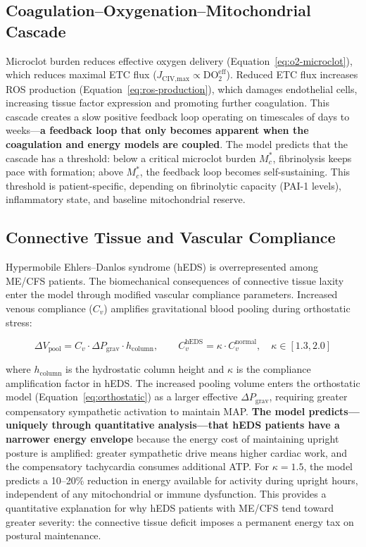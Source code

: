 \subsection{Coagulation--Oxygenation--Mitochondrial Cascade}

Microclot burden reduces effective oxygen delivery (Equation~\ref{eq:o2-microclot}), which reduces maximal ETC flux ($J_{\text{CIV,max}} \propto \text{DO}_{2}^{\text{eff}}$). Reduced ETC flux increases ROS production (Equation~\ref{eq:ros-production}), which damages endothelial cells, increasing tissue factor expression and promoting further coagulation. This cascade creates a slow positive feedback loop operating on timescales of days to weeks---\textbf{a feedback loop that only becomes apparent when the coagulation and energy models are coupled}. The model predicts that the cascade has a threshold: below a critical microclot burden $M_c^*$, fibrinolysis keeps pace with formation; above $M_c^*$, the feedback loop becomes self-sustaining. This threshold is patient-specific, depending on fibrinolytic capacity (PAI-1 levels), inflammatory state, and baseline mitochondrial reserve.

\subsection{Connective Tissue and Vascular Compliance}
\label{sec:eds-coupling}

Hypermobile Ehlers--Danlos syndrome (hEDS) is overrepresented among ME/CFS patients. The biomechanical consequences of connective tissue laxity enter the model through modified vascular compliance parameters. Increased venous compliance ($C_v$) amplifies gravitational blood pooling during orthostatic stress:

\begin{equation}
\label{eq:eds-vascular}
\Delta V_{\text{pool}} = C_v \cdot \Delta P_{\text{grav}} \cdot h_{\text{column}}, \qquad C_v^{\text{hEDS}} = \kappa \cdot C_v^{\text{normal}}, \quad \kappa \in [1.3, 2.0]
\end{equation}

where $h_{\text{column}}$ is the hydrostatic column height and $\kappa$ is the compliance amplification factor in hEDS. The increased pooling volume enters the orthostatic model (Equation~\ref{eq:orthostatic}) as a larger effective $\Delta P_{\text{grav}}$, requiring greater compensatory sympathetic activation to maintain MAP. \textbf{The model predicts---uniquely through quantitative analysis---that hEDS patients have a narrower energy envelope} because the energy cost of maintaining upright posture is amplified: greater sympathetic drive means higher cardiac work, and the compensatory tachycardia consumes additional ATP. For $\kappa = 1.5$, the model predicts a 10--20\% reduction in energy available for activity during upright hours, independent of any mitochondrial or immune dysfunction. This provides a quantitative explanation for why hEDS patients with ME/CFS tend toward greater severity: the connective tissue deficit imposes a permanent energy tax on postural maintenance.

